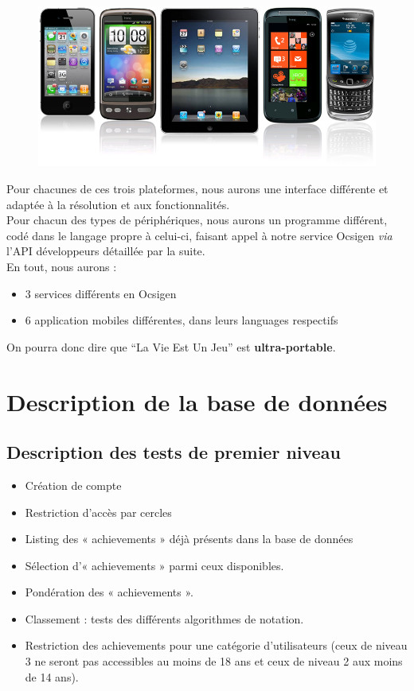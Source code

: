 \documentclass{life-fr}
\begin{document}
\begin{figure}[H]
  \begin{center}
    \includegraphics[width=13cm]{img/mobiles.jpg}
  \end{center}
\end{figure}

Pour chacunes de ces trois plateformes, nous aurons une interface différente
et adaptée à la résolution et aux fonctionnalités.\\
Pour chacun des types de périphériques, nous aurons un programme différent,
codé dans le langage propre à celui-ci, faisant appel à notre service Ocsigen
\textit{via} l'API développeurs détaillée par la suite.\\
En tout, nous aurons :
\begin{itemize}
  \item 3 services différents en Ocsigen
  \item 6 application mobiles différentes, dans leurs languages respectifs
\end{itemize}

On pourra donc dire que ``La Vie Est Un Jeu'' est \textbf{ultra-portable}.


\chapter{Description de la base de données}

\section{Description des tests de premier niveau}

\begin{itemize}
  \item Création de compte
  \item Restriction d’accès par cercles
  \item Listing des « achievements » déjà présents dans la base de données
  \item Sélection d’« achievements » parmi ceux disponibles.
  \item Pondération des « achievements ».
  \item Classement : tests des différents algorithmes de notation.
  \item Restriction des achievements pour une catégorie d’utilisateurs (ceux de niveau 3 ne seront pas accessibles au moins de 18 ans et ceux de niveau 2 aux moins de 14 ans).
\end{itemize}
\end{document}
